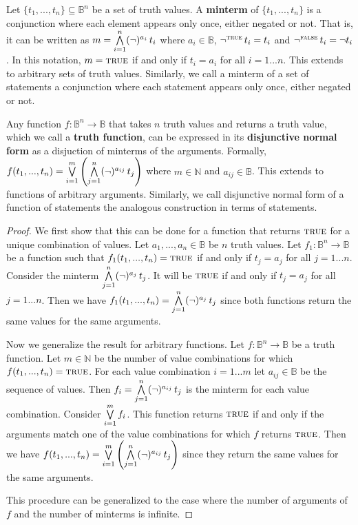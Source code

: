 \documentclass[11pt,letterpaper,fleqn]{memoir} %
\begin{document}
\begin{mathSection}
	\begin{defn}\label{def_minterm}
		Let $\{t_1, ..., t_n\} \subseteq \mathbb{B}^n$ be a set of truth values. A \textbf{minterm} of $\{t_1, ..., t_n\}$ is a conjunction where each element appears only once, either negated or not. That is, it can be written as $m = \bigwedge \limits_{i=1}^n (\neg)^{a_{i}} \, t_i$ where $a_{i} \in \mathbb{B}$, $\neg ^ {\textsc{true}} \, t_i = t_i$ and $\neg ^ {\textsc{false}} \, t_i = \neg t_i$. In this notation, $m = \textsc{true}$ if and only if $t_i = a_i$ for all $i=1...n$. This extends to arbitrary sets of truth values. Similarly, we call a minterm of a set of statements a conjunction where each statement appears only once, either negated or not.
	\end{defn}
	
	\begin{prop}\label{prop_disjunctive_normal_form}
		Any function $f : \mathbb{B}^n \to \mathbb{B}$ that takes $n$ truth values and returns a truth value, which we call a \textbf{truth function}, can be expressed in its \textbf{disjunctive normal form} as a disjuction of minterms of the arguments. Formally, $f(t_1, ..., t_n) =\bigvee \limits_{i=1}^m \left( \bigwedge \limits_{j=1}^n (\neg)^{a_{ij}} \, t_j \right)$ where $m \in \mathbb{N}$ and  $a_{ij} \in \mathbb{B}$. This extends to functions of arbitrary arguments. Similarly, we call disjunctive normal form of a function of statements the analogous construction in terms of statements.
	\end{prop}
	\begin{proof}
		We first show that this can be done for a function that returns $\textsc{true}$ for a unique combination of values. Let $a_1, ..., a_n \in \mathbb{B}$ be $n$ truth values. Let $f_1: \mathbb{B}^n \to \mathbb{B}$ be a function such that $f_1(t_1, ..., t_n) = \textsc{true}$ if and only if $t_j = a_j$ for all $j=1...n$. Consider the minterm $\bigwedge \limits_{j=1}^n (\neg)^{a_{j}} \, t_j$. It will be $\textsc{true}$ if and only if $t_j \equal a_j$ for all $j=1...n$. Then we have $f_1(t_1, ..., t_n) = \bigwedge \limits_{j=1}^n (\neg)^{a_{j}} \, t_j$ since both functions return the same values for the same arguments.
		
		Now we generalize the result for arbitrary functions. Let $f : \mathbb{B}^n \to \mathbb{B}$ be a truth function. Let $m \in \mathbb{N}$ be the number of value combinations for which $f(t_1, ..., t_n) = \textsc{true}$. For each value combination $i=1...m$ let $a_{ij} \in \mathbb{B}$ be the sequence of values. Then $f_i = \bigwedge \limits_{j=1}^n (\neg)^{a_{ij}} \, t_j$ is the minterm for each value combination. Consider $\bigvee \limits_{i=1}^m f_i$. This function returns $\textsc{true}$ if and only if the arguments match one of the value combinations for which $f$ returns $\textsc{true}$. Then we have $f(t_1, ..., t_n) =\bigvee \limits_{i=1}^m \left( \bigwedge \limits_{j=1}^n (\neg)^{a_{ij}} \, t_j \right)$ since they return the same values for the same arguments.
		
		This procedure can be generalized to the case where the number of arguments of $f$ and the number of minterms is infinite.
	\end{proof}
\end{mathSection}
\end{document}
